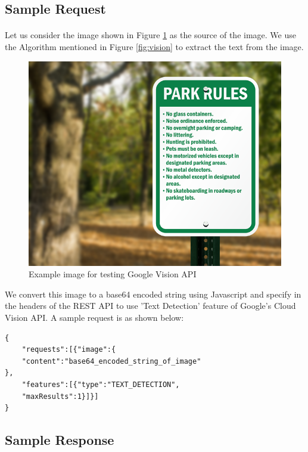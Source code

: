 \documentclass[12pt]{article}
\begin{document}
\subsection{Sample Request}

\paragraph{}Let us consider the image shown in Figure \ref{fig:request_sample} as the source of the image. We use the Algorithm mentioned in Figure \ref{fig:vision} to extract the text from the image.

\begin{figure}[H]
	\centering
	\includegraphics[width=1.0\linewidth]{media/request_sample.png}
	\caption{Example image for testing Google Vision API}
	\label{fig:request_sample}
\end{figure} 

We convert this image to a base64 encoded string using Javascript and specify in the headers of the REST API to use 'Text Detection' feature of Google's Cloud Vision API. A sample request is as shown below:

\begin{lstlisting}
{
	"requests":[{"image":{
	"content":"base64_encoded_string_of_image"
},	
	"features":[{"type":"TEXT_DETECTION",
	"maxResults":1}]}]
}
\end{lstlisting}

\subsection{Sample Response}
\end{document}
